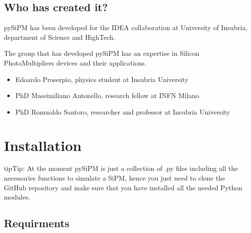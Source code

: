 \documentclass[letterpaper,10pt,english]{sphinxmanual}
\begin{document}
\section{Who has created it?}
\label{\detokenize{introduction:who-has-created-it}}
\begin{DUlineblock}{0em}
\item[] pySiPM has been developed for the IDEA collaboration at University of Insubria, department of Science and HighTech.
\item[] The group that has developed pySiPM has an expertise in Silicon PhotoMultipliers devices and their applications.
\end{DUlineblock}
\begin{itemize}
\item {} 
Edoardo Proserpio, physics student at Insubria University 

\item {} 
PhD Massimiliano Antonello, research fellow at INFN Milano 

\item {} 
PhD Romualdo Santoro, researcher and professor at Insubria University 

\end{itemize}


\chapter{Installation}
\label{\detokenize{installation:installation}}\label{\detokenize{installation::doc}}
\begin{sphinxadmonition}{tip}{Tip:}
At the moment pySiPM is just a collection of .py files including all the necessaries functions to simulate a SiPM, hence you just need to clone the GitHub repository and make sure that you have installed all the needed Python modules.
\end{sphinxadmonition}


\section{Requirments}
\label{\detokenize{installation:requirments}}
\end{document}
